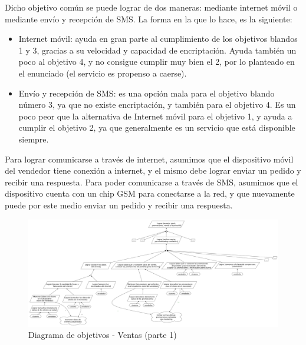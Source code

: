 Dicho objetivo común se puede lograr de dos maneras: mediante internet móvil o mediante envío y recepción de SMS. La forma en la que lo hace, es la siguiente:
\begin{itemize}
  \item Internet móvil: ayuda en gran parte al cumplimiento de los objetivos blandos 1 y 3, gracias a su velocidad y capacidad de encriptación. Ayuda también un poco al objetivo 4, y no consigue cumplir muy bien el 2, por lo planteado en el enunciado (el servicio es propenso a caerse).

  \item Envío y recepción de SMS: es una opción mala para el objetivo blando número 3, ya que no existe encriptación, y también para el objetivo 4. Es un poco peor que la alternativa de Internet móvil para el objetivo 1, y ayuda a cumplir el objetivo 2, ya que generalmente es un servicio que está disponible siempre.
\end{itemize}

\indent Para lograr comunicarse a través de internet, asumimos que el dispositivo móvil del vendedor tiene conexión a internet, y el mismo debe lograr enviar un pedido y recibir una respuesta. Para poder comunicarse a través de SMS, asumimos que el dispositivo cuenta con un chip GSM para conectarse a la red, y que nuevamente puede por este medio enviar un pedido y recibir una respuesta.

\begin{figure}[h!]
  \centering
  \includegraphics[width=1.5\textwidth, angle=90]{./imagenes/ventas_1.pdf}
  \caption{Diagrama de objetivos - Ventas (parte 1)}
\end{figure}


\clearpage

\clearpage

